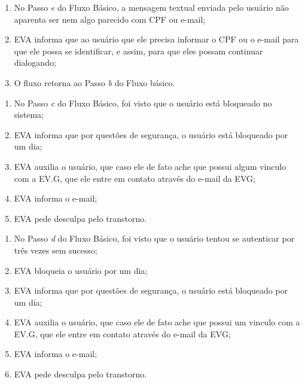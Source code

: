     \begin{enumerate}[label=\alph*)]
    \tightlist
        \item No Passo \textit{e} do Fluxo Básico, a mensagem textual enviada pelo usuário não aparenta ser nem algo parecido com CPF ou e-mail;
        \item EVA informa que ao usuário que ele precisa informar o CPF ou o e-mail para que ele possa se identificar, e assim, para que eles possam continuar dialogando;
        \item O fluxo retorna ao Passo \textit{b} do Fluxo básico.
    \end{enumerate}
        
    \begin{enumerate}[label=\alph*)]
    \tightlist
        \item No Passo \textit{c} do Fluxo Básico, foi visto que o usuário está bloqueado no sistema;
        \item EVA informa que por questões de segurança, o usuário está bloqueado por um dia;
        \item EVA auxilia o usuário, que caso ele de fato ache que possui algum vinculo com a EV.G, que ele entre em contato através do e-mail da EVG;
        \item EVA informa o e-mail;
        \item EVA pede desculpa pelo transtorno.
    \end{enumerate}
        
        \begin{enumerate}[label=\alph*)]
        \tightlist
            \item No Passo \textit{d} do Fluxo Básico, foi visto que o usuário tentou se autenticar por três vezes sem sucesso;
            \item EVA bloqueia o usuário por um dia;
            \item EVA informa que por questões de segurança, o usuário está bloqueado por um dia;
            \item EVA auxilia o usuário, que caso ele de fato ache que possui um vinculo com a EV.G, que ele entre em contato através do e-mail da EVG;
            \item EVA informa o e-mail;
            \item EVA pede desculpa pelo transtorno.
        \end{enumerate}


